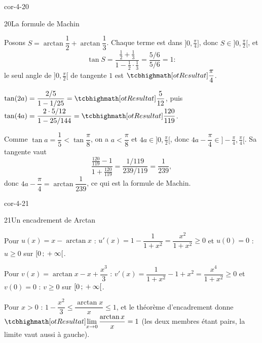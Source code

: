 \begin{blocLivre}{cor-4-20}
\begin{corrige}{20}{La formule de Machin}
\begin{questions}
  \item Posons $S=\arctan\dfrac12+\arctan\dfrac13$. Chaque terme est dans
    $\bigl]0,\frac{\pi}{4}\bigr]$, donc $S\in\bigl]0,\frac{\pi}{2}\bigr[$, et
    \[
      \tan S=\frac{\frac12+\frac13}{1-\frac12\cdot\frac13}=\frac{5/6}{5/6}=1 :
    \]
    le seul angle de $\bigl]0,\frac{\pi}{2}\bigr[$ de tangente $1$ est
    $\res{\dfrac{\pi}{4}}$.
  \item $\tan(2a)=\dfrac{2/5}{1-1/25}=\res{\dfrac{5}{12}}$, puis
    $\tan(4a)=\dfrac{2\cdot5/12}{1-25/144}=\res{\dfrac{120}{119}}$.
  \item Comme $\tan a=\dfrac15<\tan\dfrac{\pi}{8}$, on a $a<\dfrac{\pi}{8}$
    et $4a\in\bigl]0,\frac{\pi}{2}\bigr[$, donc
    $4a-\dfrac{\pi}{4}\in\bigl]-\frac{\pi}{4},\frac{\pi}{4}\bigr[$. Sa tangente vaut
    \[
      \frac{\frac{120}{119}-1}{1+\frac{120}{119}}=\frac{1/119}{239/119}=\frac{1}{239},
    \]
    donc $4a-\dfrac{\pi}{4}=\arctan\dfrac{1}{239}$, ce qui est la formule de
    Machin.
\end{questions}
\end{corrige}
\end{blocLivre}

\begin{blocLivre}{cor-4-21}
\begin{corrige}{21}{Un encadrement de Arctan}
\begin{questions}
  \item Pour $u(x)=x-\arctan x$ : $u'(x)=1-\dfrac{1}{1+x^{2}}
    =\dfrac{x^{2}}{1+x^{2}}\geq0$ et $u(0)=0$ : $u\geq0$ sur $\mathopen{[}0\,{;}\,+\infty\mathclose{[}$.
  \item Pour $v(x)=\arctan x-x+\dfrac{x^{3}}{3}$ :
    $v'(x)=\dfrac{1}{1+x^{2}}-1+x^{2}=\dfrac{x^{4}}{1+x^{2}}\geq0$ et
    $v(0)=0$ : $v\geq0$ sur $\mathopen{[}0\,{;}\,+\infty\mathclose{[}$.
  \item Pour $x>0$ : $1-\dfrac{x^{2}}{3}\leq\dfrac{\arctan x}{x}\leq1$, et le
    théorème d'encadrement donne
    $\res{\displaystyle\lim_{x\to0}\frac{\arctan x}{x}=1}$ (les deux membres
    étant pairs, la limite vaut aussi à gauche).
\end{questions}
\end{corrige}
\end{blocLivre}

